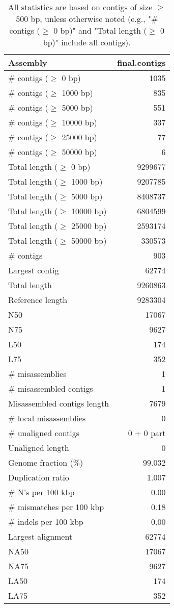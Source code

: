 \documentclass[12pt,a4paper]{article}
\begin{document}
\begin{table}[ht]
\begin{center}
\caption{All statistics are based on contigs of size $\geq$ 500 bp, unless otherwise noted (e.g., "\# contigs ($\geq$ 0 bp)" and "Total length ($\geq$ 0 bp)" include all contigs).}
\begin{tabular}{|l*{1}{|r}|}
\hline
Assembly & final.contigs \\ \hline
\# contigs ($\geq$ 0 bp) & 1035 \\ \hline
\# contigs ($\geq$ 1000 bp) & 835 \\ \hline
\# contigs ($\geq$ 5000 bp) & 551 \\ \hline
\# contigs ($\geq$ 10000 bp) & 337 \\ \hline
\# contigs ($\geq$ 25000 bp) & 77 \\ \hline
\# contigs ($\geq$ 50000 bp) & 6 \\ \hline
Total length ($\geq$ 0 bp) & 9299677 \\ \hline
Total length ($\geq$ 1000 bp) & 9207785 \\ \hline
Total length ($\geq$ 5000 bp) & 8408737 \\ \hline
Total length ($\geq$ 10000 bp) & 6804599 \\ \hline
Total length ($\geq$ 25000 bp) & 2593174 \\ \hline
Total length ($\geq$ 50000 bp) & 330573 \\ \hline
\# contigs & 903 \\ \hline
Largest contig & 62774 \\ \hline
Total length & 9260863 \\ \hline
Reference length & 9283304 \\ \hline
N50 & 17067 \\ \hline
N75 & 9627 \\ \hline
L50 & 174 \\ \hline
L75 & 352 \\ \hline
\# misassemblies & 1 \\ \hline
\# misassembled contigs & 1 \\ \hline
Misassembled contigs length & 7679 \\ \hline
\# local misassemblies & 0 \\ \hline
\# unaligned contigs & 0 + 0 part \\ \hline
Unaligned length & 0 \\ \hline
Genome fraction (\%) & 99.032 \\ \hline
Duplication ratio & 1.007 \\ \hline
\# N's per 100 kbp & 0.00 \\ \hline
\# mismatches per 100 kbp & 0.18 \\ \hline
\# indels per 100 kbp & 0.00 \\ \hline
Largest alignment & 62774 \\ \hline
NA50 & 17067 \\ \hline
NA75 & 9627 \\ \hline
LA50 & 174 \\ \hline
LA75 & 352 \\ \hline
\end{tabular}
\end{center}
\end{table}
\end{document}
